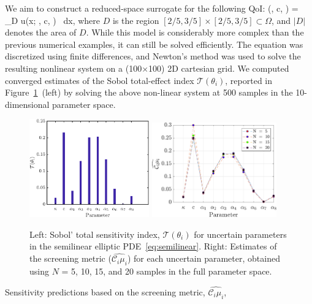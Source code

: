 We aim to construct a reduced-space surrogate for the following QoI:
\be
{}(\kappa, c, \theta) =  \int_D u(x; \kappa, c, \theta) \, dx, 
\label{eq:qoi}
\ee
%
where $D$ is the region $[2/5, 3/5] \times [2/5, 3/5] \subset \Omega$, 
and $|D|$ denotes the area of $D$. 
While this model is considerably more complex than the previous numerical
examples, it can still be solved efficiently.
The equation was discretized using finite differences, and Newton's method
was used to solve the resulting nonlinear system on a (100$\times$100) 2D
cartesian grid.
We computed converged estimates of the Sobol
total-effect index $\mathcal{T}(\theta_i)$, reported 
in Figure~\ref{fig:sense_elliptic}~(left) by solving the above non-linear
system at 500 samples in the 10-dimensional parameter space. 
%
\begin{figure}[htbp]
 \begin{center}
  \includegraphics[width=0.46\textwidth]{./Figures/sense_elliptic}
  \includegraphics[width=0.48\textwidth]{./Figures/ub_conv_elliptic}
\caption{
Left: Sobol' total sensitivity index, $\mathcal{T}(\theta_i)$ for uncertain parameters in the 
semilinear elliptic PDE~\eqref{eq:semilinear}. Right: 
Estimates of the screening metric ($\widehat{\mathcal{C}_i\mu_i}$) for each uncertain parameter,
obtained using $N$ = 5, 10, 15, and 20 samples in the full parameter space.}
\label{fig:sense_elliptic}
\end{center}
\end{figure}
%
Sensitivity predictions based on the screening metric, $\widehat{\mathcal{C}_i\mu_i}$,
